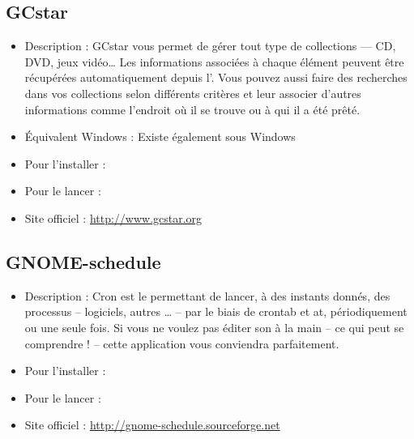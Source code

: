 \subsection{GCstar}
\begin{itemize}
\begingroup
{}
\item Description : GCstar vous permet de gérer tout type de collections --- CD, DVD, jeux vidéo\ldots{} Les informations associées à chaque élément peuvent être récupérées automatiquement depuis l'. Vous pouvez aussi faire des recherches dans vos collections selon différents critères et leur associer d'autres informations comme l'endroit où il se trouve ou à qui il a été prêté.{\par}
\item Équivalent Windows : Existe également sous Windows{\par}
\item Pour l'installer : 
\item Pour le lancer : 
\item Site officiel : \url{http://www.gcstar.org}{\par}
\endgroup
\end{itemize}
\newpage
\subsection{GNOME-schedule}
\begin{itemize}
\begingroup
{}
\item Description : Cron est le  permettant de lancer, à des instants donnés, des processus -- logiciels, autres \ldots{} -- par le biais de crontab et at, périodiquement ou une seule fois. Si vous ne voulez pas éditer son  à la main -- ce qui peut se comprendre ! -- cette application vous conviendra parfaitement.{\par}
\endgroup
\item Pour l'installer : 
\item Pour le lancer : 
\item Site officiel : \url{http://gnome-schedule.sourceforge.net}{\par}
\end{itemize}

